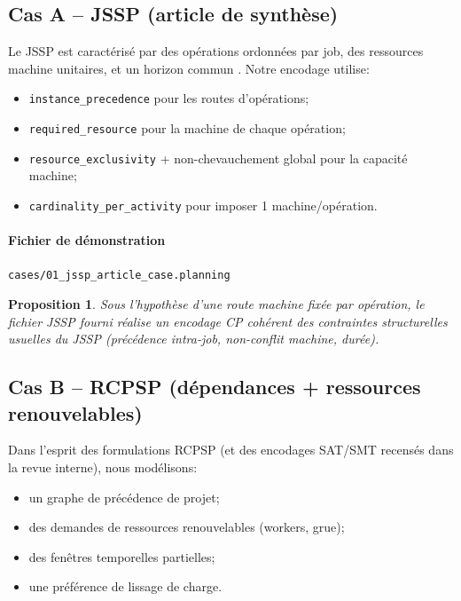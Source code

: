 \documentclass[12pt,a4paper]{article}
\newtheorem{proposition}{Proposition}
\begin{document}
\subsection{Cas A -- JSSP (article de synthèse)}
Le JSSP est caractérisé par des opérations ordonnées par job, des ressources machine unitaires, et un horizon commun \cite{abdolrazzagh2017jssp,garey1976jssp}. Notre encodage utilise:
\begin{itemize}
  \item \texttt{instance\_precedence} pour les routes d'opérations;
  \item \texttt{required\_resource} pour la machine de chaque opération;
  \item \texttt{resource\_exclusivity} + non-chevauchement global pour la capacité machine;
  \item \texttt{cardinality\_per\_activity} pour imposer 1 machine/opération.
\end{itemize}

\paragraph{Fichier de démonstration}
\texttt{cases/01\_jssp\_article\_case.planning}



\begin{proposition}
Sous l'hypothèse d'une route machine fixée par opération, le fichier JSSP fourni réalise un encodage CP cohérent des contraintes structurelles usuelles du JSSP (précédence intra-job, non-conflit machine, durée).
\end{proposition}

\subsection{Cas B -- RCPSP (dépendances + ressources renouvelables)}
Dans l'esprit des formulations RCPSP (et des encodages SAT/SMT recensés dans la revue interne), nous modélisons:
\begin{itemize}
  \item un graphe de précédence de projet;
  \item des demandes de ressources renouvelables (workers, grue);
  \item des fenêtres temporelles partielles;
  \item une préférence de lissage de charge.
\end{itemize}
\end{document}
